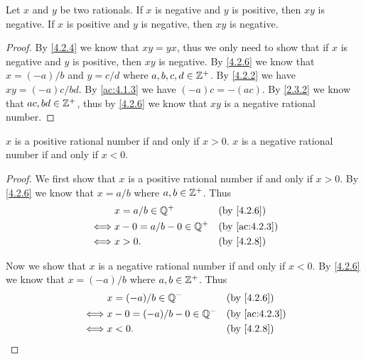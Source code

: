 \begin{ac}\label{ac:4.2.6}
  Let \(x\) and \(y\) be two rationals.
  If \(x\) is negative and \(y\) is positive, then \(xy\) is negative.
  If \(x\) is positive and \(y\) is negative, then \(xy\) is negative.
\end{ac}

\begin{proof}
  By \cref{4.2.4} we know that \(xy = yx\), thus we only need to show that if \(x\) is negative and \(y\) is positive, then \(xy\) is negative.
  By \cref{4.2.6} we know that \(x = (-a) / b\) and \(y = c / d\) where \(a, b, c, d \in \mathbb{Z}^+\).
  By \cref{4.2.2} we have \(xy = (-a)c / bd\).
  By \cref{ac:4.1.3} we have \((-a)c = -(ac)\).
  By \cref{2.3.2} we know that \(ac, bd \in \mathbb{Z}^+\), thus by \cref{4.2.6} we know that \(xy\) is a negative rational number.
\end{proof}

\begin{ac}\label{ac:4.2.7}
  \(x\) is a positive rational number if and only if \(x > 0\).
  \(x\) is a negative rational number if and only if \(x < 0\).
\end{ac}

\begin{proof}
  We first show that \(x\) is a positive rational number if and only if \(x > 0\).
  By \cref{4.2.6} we know that \(x = a / b\) where \(a, b \in \mathbb{Z}^+\).
  Thus
  \begin{align*}
         & x = a / b \in \Q^+         &  & \by{4.2.6}                  \\
    \iff & x - 0 = a / b - 0 \in \Q^+ &  & \text{(by \cref{ac:4.2.3})} \\
    \iff & x > 0.                     &  & \by{4.2.8}
  \end{align*}

  Now we show that \(x\) is a negative rational number if and only if \(x < 0\).
  By \cref{4.2.6} we know that \(x = (-a) / b\) where \(a, b \in \mathbb{Z}^+\).
  Thus
  \begin{align*}
         & x = (-a) / b \in \Q^-         &  & \by{4.2.6}                  \\
    \iff & x - 0 = (-a) / b - 0 \in \Q^- &  & \text{(by \cref{ac:4.2.3})} \\
    \iff & x < 0.                        &  & \by{4.2.8}
  \end{align*}
\end{proof}

